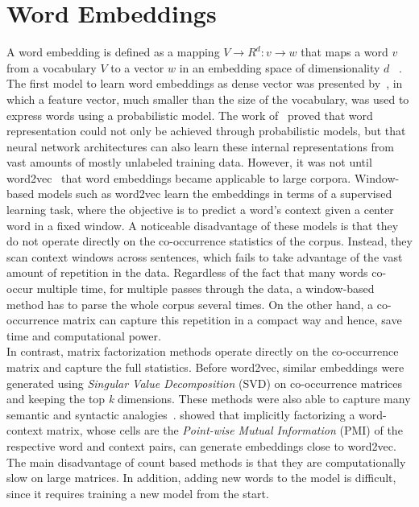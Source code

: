 \section{Word Embeddings }
\label{sec:wordembeddig}
A word embedding is defined as a mapping $ V\rightarrow { R }^{ d }:v \rightarrow w $ that maps a word $v$ from a vocabulary $V$ to a vector  $w$  in an embedding space of dimensionality $d$ ~. \\
The first model to learn word embeddings as dense vector was presented by~, in which a feature vector, much smaller than the size of the vocabulary, was used to express words using a probabilistic model. The work of~ proved that word representation could not only be achieved through probabilistic models, but that neural network architectures can also learn these internal representations from vast amounts of mostly unlabeled training data. However, it was not until word2vec~ that word embeddings became applicable to large corpora. 
Window-based models such as word2vec learn the embeddings in terms of a supervised learning task, where the objective is to predict a word's context given a center word in a fixed window. A noticeable disadvantage of these models is that they do not operate directly on the co-occurrence statistics of the corpus. Instead, they scan context windows across sentences, which fails to take advantage of the vast amount of repetition in the data. Regardless of the fact that many words co-occur multiple time, for multiple passes through the data, a window-based method has to parse the whole corpus several times. On the other hand, a co-occurrence matrix can capture this repetition in a compact way and hence, save time and computational power.  \\
In contrast, matrix factorization methods operate directly on the co-occurrence matrix and capture the full statistics. Before word2vec, similar embeddings were generated using \emph{Singular Value Decomposition} (SVD) on co-occurrence matrices and keeping the top \emph{k} dimensions. These methods were also able to capture many semantic and syntactic analogies~.  showed that implicitly factorizing
a word-context matrix, whose cells are the \emph{Point-wise Mutual Information} (PMI) of
the respective word and context pairs, can generate embeddings close to word2vec. The main disadvantage of count based methods is that they are computationally slow on large matrices. In addition, adding new words to the model is difficult, since it requires training a new model from the start.\\
